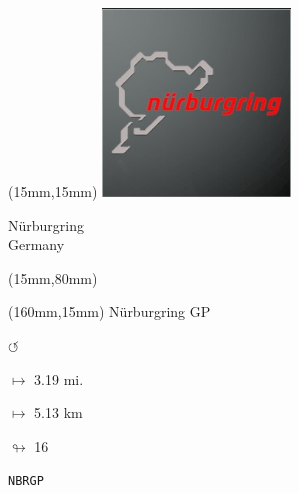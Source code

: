 \begin{textblock*}{50mm}(15mm,15mm)%
\includegraphics[width=50mm]{LG/2015-05-20_00089.png}
\par Nürburgring\\ Germany
\end{textblock*}
\begin{textblock*}{185mm}(15mm,80mm)%
\end{textblock*}
\begin{textblock*}{40mm}(160mm,15mm)%
Nürburgring GP
\par \Huge$\circlearrowleft$
\Large
\par$\mapsto$ 3.19 mi.
\par$\mapsto$ 5.13 km
\par$\looparrowright$ 16
\par\hfill\tiny\tt NBRGP\\
\end{textblock*}
\null\newpage

